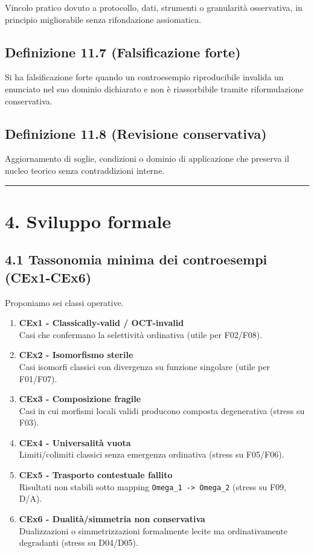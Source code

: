 Vincolo pratico dovuto a protocollo, dati, strumenti o granularità osservativa, in principio migliorabile senza rifondazione assiomatica.

\subsection{Definizione 11.7 (Falsificazione forte)}

Si ha falsificazione forte quando un controesempio riproducibile invalida un enunciato nel suo dominio dichiarato e non è riassorbibile tramite riformulazione conservativa.

\subsection{Definizione 11.8 (Revisione conservativa)}

Aggiornamento di soglie, condizioni o dominio di applicazione che preserva il nucleo teorico senza contraddizioni interne.

\begin{center}\rule{0.5\linewidth}{0.5pt}\end{center}

\section{4. Sviluppo formale}

\subsection{4.1 Tassonomia minima dei controesempi (CEx1-CEx6)}

Proponiamo sei classi operative.

\begin{enumerate}
\def\labelenumi{\arabic{enumi}.}
\item
  \textbf{CEx1 - Classically-valid / OCT-invalid}\\
  Casi che confermano la selettività ordinativa (utile per F02/F08).
\item
  \textbf{CEx2 - Isomorfismo sterile}\\
  Casi isomorfi classici con divergenza su funzione singolare (utile per F01/F07).
\item
  \textbf{CEx3 - Composizione fragile}\\
  Casi in cui morfismi locali validi producono composta degenerativa (stress su F03).
\item
  \textbf{CEx4 - Universalità vuota}\\
  Limiti/colimiti classici senza emergenza ordinativa (stress su F05/F06).
\item
  \textbf{CEx5 - Trasporto contestuale fallito}\\
  Risultati non stabili sotto mapping \texttt{Omega\_1\ -\textgreater{}\ Omega\_2} (stress su F09, D/A).
\item
  \textbf{CEx6 - Dualità/simmetria non conservativa}\\
  Dualizzazioni o simmetrizzazioni formalmente lecite ma ordinativamente degradanti (stress su D04/D05).
\end{enumerate}

